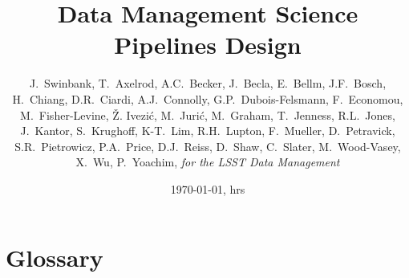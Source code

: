 \documentclass[DM,lsstdraft,toc]{lsstdoc}
\title{Data Management Science Pipelines Design}
\author{
    J.~Swinbank, 
    T.~Axelrod,  A.C.~Becker, J.~Becla, E.~Bellm,
    J.F.~Bosch,  H.~Chiang, D.R.~Ciardi,  A.J.~Connolly,  G.P.~Dubois-Felsmann,
    F.~Economou, M.~Fisher-Levine, \v{Z}. Ivezi\'c,  M.~Juri\'c, M.~Graham,
    T.~Jenness,  R.L.~Jones, J.~Kantor, S.~Krughoff, K-T.~Lim, R.H.~Lupton, 
    F.~Mueller,  D.~Petravick, S.R.~Pietrowicz, P.A.~Price,  D.J.~Reiss, D.~Shaw, C.~Slater,
    M.~Wood-Vasey, X.~Wu, P.~Yoachim,
     \emph{for the LSST Data Management}
}
\date{\today, \currenttime hrs}
\begin{document}
\maketitle













\section{Glossary}
\end{document}
